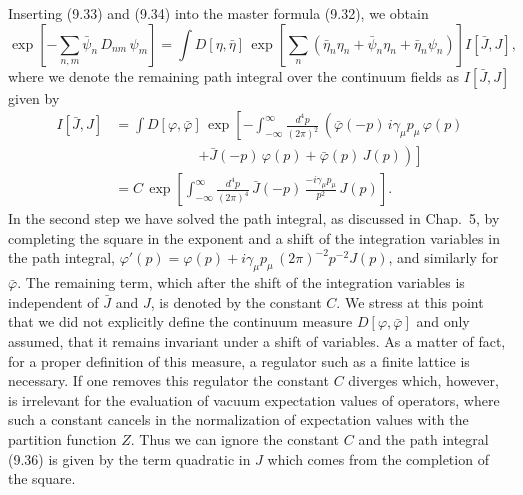 Inserting (9.33) and (9.34) into the master formula (9.32), we obtain
\begin{equation}
  \exp\!\left[-\sum_{n,m}\bar\psi_n\,D_{nm}\,\psi_m\right]
  = \int D[\eta,\bar\eta]\,
    \exp\!\left[\sum_n\left(\bar\eta_n\eta_n + \bar\psi_n\eta_n + \bar\eta_n\psi_n\right)\right]
    I[\bar J,J] ,
\end{equation}
where we denote the remaining path integral over the continuum fields as
$I[\bar J,J]$ given by
\begin{equation}
  \begin{split}
    I[\bar J,J]
    &= \int D[\varphi,\bar\varphi]\,
      \exp\!\left[-\int_{-\infty}^{\infty}\frac{d^4p}{(2\pi)^2}\,
        \left(\bar\varphi(-p)\,i\gamma_\mu p_\mu\,\varphi(p)\right.\right. \\
    &\qquad\qquad\qquad
        \left.\left.+ \bar J(-p)\,\varphi(p) + \bar\varphi(p)\,J(p)\right)\right] \\
    &= C\,\exp\!\left[\int_{-\infty}^{\infty}\frac{d^4p}{(2\pi)^4}\,
        \bar J(-p)\,\frac{-i\gamma_\mu p_\mu}{p^2}\,J(p)\right] .
  \end{split}
\end{equation}
In the second step we have solved the path integral, as discussed in Chap.~5,
by completing the square in the exponent and a shift of the integration
variables in the path integral, $\varphi'(p) = \varphi(p) + i\gamma_\mu
p_\mu\,(2\pi)^{-2}p^{-2}J(p)$, and similarly for $\bar\varphi$. The remaining
term, which after the shift of the integration variables is independent of
$\bar J$ and $J$, is denoted by the constant $C$. We stress at this point that
we did not explicitly define the continuum measure $D[\varphi,\bar\varphi]$
and only assumed, that it remains invariant under a shift of variables. As a
matter of fact, for a proper definition of this measure, a regulator such as a
finite lattice is necessary. If one removes this regulator the constant $C$
diverges which, however, is irrelevant for the evaluation of vacuum
expectation values of operators, where such a constant cancels in the
normalization of expectation values with the partition function $Z$. Thus we
can ignore the constant $C$ and the path integral (9.36) is given by the term
quadratic in $J$ which comes from the completion of the square.

